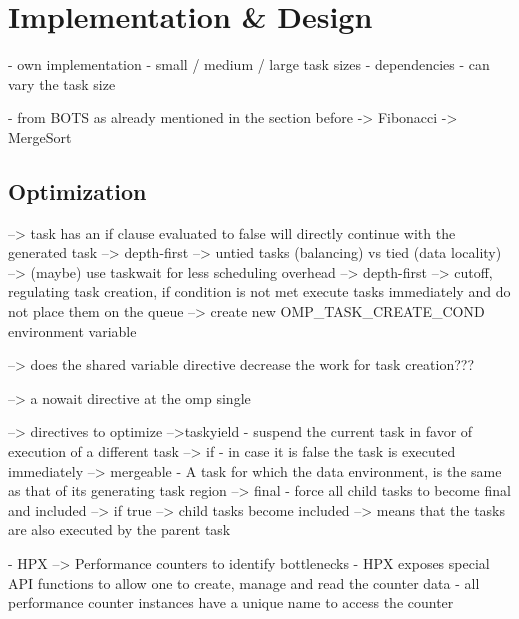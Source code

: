 \section{Implementation \& Design}
- own implementation
  - small / medium / large task sizes
  - dependencies
  - can vary the task size
  
- from BOTS
	as already mentioned in the section before
	-> Fibonacci
	-> MergeSort
		
		
\subsection{Optimization}
	
	\cite{LaGrone.2011}
	--> task has an if clause evaluated to false will directly continue with the generated task --> depth-first
	--> untied tasks (balancing) vs tied (data locality)
	--> (maybe) use taskwait for less scheduling overhead --> depth-first
	--> cutoff, regulating task creation, if condition is not met execute tasks immediately and do not place them on the queue
		--> create new OMP_TASK_CREATE_COND environment variable
		
    --> does the shared variable directive decrease the work for task creation???
    
    --> a nowait directive at the omp single
    
    \cite{MKlemm.2018}
 --> directives to optimize
 	-->taskyield - suspend the current task in favor of execution of a different task
 	--> if - in case it is false the task is executed immediately
 	--> mergeable - A task for which the data environment, is the same as that of its generating task region
 	--> final - force all child tasks to become final and included
 		--> if true --> child tasks become included --> means that the tasks are also executed by the parent task


  \cite{TheSTEARGroup.15.01.2020}
    - HPX --> Performance counters to identify bottlenecks
    - HPX exposes special API functions to allow one to create, manage and read the counter data
    - all performance counter instances have a unique name to access the counter